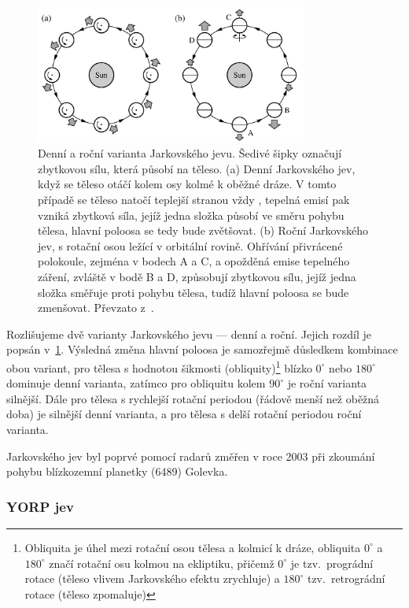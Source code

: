 \documentclass[A4paper, 12pt, oneside]{book}
\begin{document}
\begin{figure} 
	\centering

		\includegraphics[width=0.8\textwidth]{obr/jarkovskeho_jev.png}
	\caption{Denní a roční varianta Jarkovského jevu. Šedivé šipky
	označují zbytkovou sílu, která působí na těleso. (a) Denní Jarkovského jev, když se těleso otáčí kolem osy kolmé k oběžné dráze. V tomto případě se těleso natočí teplejší stranou vždy , tepelná emisí pak vzniká zbytková síla, jejíž jedna složka působí ve směru pohybu tělesa, hlavní poloosa se tedy bude zvětšovat. (b) Roční Jarkovského jev, s rotační osou ležící v orbitální rovině. Ohřívání přivrácené polokoule, zejména v bodech A a C, a opožděná emise tepelného záření, zvláště v bodě B a D, způsobují zbytkovou sílu, jejíž jedna složka směřuje proti pohybu tělesa, tudíž hlavní poloosa se bude zmenšovat. Převzato z~\cite{fmt}.} \label{fig:jarko}
\end{figure}

Rozlišujeme dvě varianty Jarkovského jevu --- denní a roční. Jejich rozdíl je popsán v~\ref{fig:jarko}. Výsledná změna hlavní poloosa je samozřejmě důsledkem kombinace obou variant, pro tělesa s hodnotou šikmosti (obliquity)\footnote{Obliquita je úhel mezi rotační osou tělesa a kolmicí k dráze, obliquita $0^\circ$ a $180^\circ$ značí rotační osu kolmou na ekliptiku, přičemž $0^\circ$ je tzv.\ prográdní rotace (těleso vlivem Jarkovského efektu zrychluje) a $180^\circ$ tzv.\ retrográdní rotace (těleso zpomaluje)} blízko $0^\circ$ nebo $180^\circ$ dominuje denní varianta, zatímco pro obliquitu kolem $90^\circ$ je roční varianta silnější. Dále pro tělesa s rychlejší rotační periodou (řádově menší než oběžná doba) je silnější denní varianta, a pro tělesa s delší rotační periodou roční varianta. 

Jarkovského jev byl poprvé pomocí radarů změřen v roce 2003 při zkoumání pohybu blízkozemní planetky (6489) Golevka.~\cite{chesley03}
\subsubsection{YORP jev}
\end{document}
